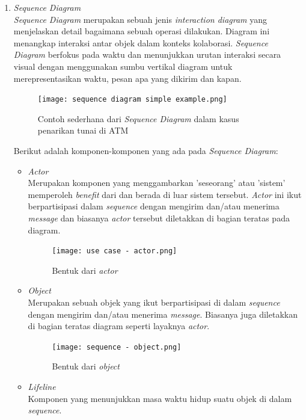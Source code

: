 \documentclass[a4paper]{article}
\begin{document}
\begin{enumerate}
\begin{itemize}
    \end{itemize}
    \item \textit{Sequence Diagram}\\
    \textit{Sequence Diagram} merupakan sebuah jenis \textit{interaction diagram} yang menjelaskan detail bagaimana sebuah operasi dilakukan. Diagram ini menangkap interaksi antar objek dalam konteks kolaborasi. \textit{Sequence Diagram} berfokus pada waktu dan menunjukkan urutan interaksi secara visual dengan menggunakan sumbu vertikal diagram untuk merepresentasikan waktu, pesan apa yang dikirim dan kapan\autocite{what-is-sequence-diagram}.
    \begin{figure}[h]
        \centering
        \texttt{[image: sequence diagram simple example.png]}
        \caption{Contoh sederhana dari \textit{Sequence Diagram} dalam kasus penarikan tunai di ATM}
    \end{figure}
    Berikut adalah komponen-komponen yang ada pada \textit{Sequence Diagram}:
        \newpage
    \begin{itemize}
        \item \textit{Actor}\\
        Merupakan komponen yang menggambarkan 'seseorang' atau 'sistem' memperoleh \textit{benefit} dari dan berada di luar sistem tersebut. \textit{Actor} ini ikut berpartisipasi dalam \textit{sequence} dengan mengirim dan/atau menerima \textit{message} dan biasanya \textit{actor} tersebut diletakkan di bagian teratas pada diagram\autocite{systemanalysisdesign-sequence-diagram}.
        \begin{figure}[h]
            \centering
            \texttt{[image: use case - actor.png]}
            \caption{Bentuk dari \textit{actor}}
        \end{figure}
        \item \textit{Object}\\
        Merupakan sebuah objek yang ikut berpartisipasi di dalam \textit{sequence} dengan mengirim dan/atau menerima \textit{message}. Biasanya juga diletakkan di bagian teratas diagram seperti layaknya \textit{actor}\autocite{systemanalysisdesign-sequence-diagram}.
        \begin{figure}[h]
            \centering
            \texttt{[image: sequence - object.png]}
            \caption{Bentuk dari \textit{object}}
        \end{figure}
        \item \textit{Lifeline}\\
        Komponen yang menunjukkan masa waktu hidup suatu objek di dalam \textit{sequence}\autocite{systemanalysisdesign-sequence-diagram}.

\end{itemize}
\end{enumerate}
\end{document}

